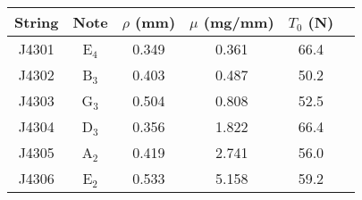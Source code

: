 \begin{tabular}{cccccc}
\toprule
String & Note & $\rho$ (mm) & $\mu$ (mg/mm) & $T_0$ (N) \\
\midrule
J4301 & E$_{4}$ & 0.349 & 0.361 & 66.4 \\
J4302 & B$_{3}$ & 0.403 & 0.487 & 50.2 \\
J4303 & G$_{3}$ & 0.504 & 0.808 & 52.5 \\
J4304 & D$_{3}$ & 0.356 & 1.822 & 66.4 \\
J4305 & A$_{2}$ & 0.419 & 2.741 & 56.0 \\
J4306 & E$_{2}$ & 0.533 & 5.158 & 59.2 \\
\bottomrule
\end{tabular}

